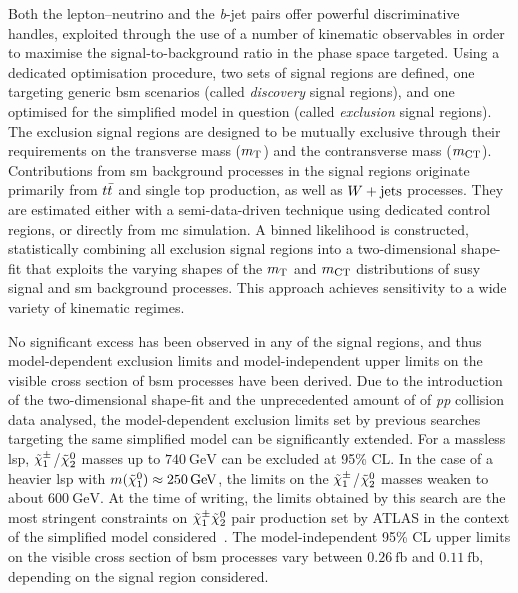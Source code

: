Both the lepton--neutrino and the \textit{b}-jet pairs offer powerful discriminative handles, exploited through the use of a number of kinematic observables in order to maximise the signal-to-background ratio in the phase space targeted.
Using a dedicated optimisation procedure, two sets of signal regions are defined, one targeting generic \gls{bsm} scenarios (called \textit{discovery} signal regions), and one optimised for the simplified model in question (called \textit{exclusion} signal regions). 
The exclusion signal regions are designed to be mutually exclusive through their requirements on the transverse mass ($m_{\textrm{T}}$) and the contransverse mass ($m_{\textrm{CT}}$).
Contributions from \gls{sm} background processes in the signal regions originate primarily from $t\bar{t}$ and single top production, as well as $W+\mathrm{jets}$ processes. They are estimated either with a semi-data-driven technique using dedicated control regions, or directly from \gls{mc} simulation.
A binned likelihood is constructed, statistically combining all exclusion signal regions into a two-dimensional shape-fit that exploits the varying shapes of the $m_{\textrm{T}}$ and $m_{\textrm{CT}}$ distributions of \gls{susy} signal and \gls{sm} background processes. This approach achieves sensitivity to a wide variety of kinematic regimes.

No significant excess has been observed in any of the signal regions, and thus model-dependent exclusion limits and model-independent upper limits on the visible cross section of \gls{bsm} processes have been derived.
Due to the introduction of the two-dimensional shape-fit and the unprecedented amount of \onethirtynineifb of \textit{pp} collision data analysed, the model-dependent exclusion limits set by previous searches targeting the same simplified model can be significantly extended.
For a massless \gls{lsp}, \mbox{$\tilde{\chi}_1^\pm$/$\tilde{\chi}_2^0$} masses up to $\SI{740}{\GeV}$ can be excluded at 95\% CL. In the case of a heavier \gls{lsp} with $m(\lsp)\approx\SI{250}{\GeV}$, the limits on the \mbox{$\tilde{\chi}_1^\pm$/$\tilde{\chi}_2^0$} masses weaken to about $\SI{600}{\GeV}$.
At the time of writing, the limits obtained by this search are the most stringent constraints on $\tilde{\chi}_1^\pm\tilde{\chi}_2^0$ pair production set by ATLAS in the context of the simplified model considered~\cite{ATL-PHYS-PUB-2020-020}.
The model-independent 95\% CL upper limits on the visible cross section of \gls{bsm} processes vary between $\SI{0.26}{\femto\barn}$ and $\SI{0.11}{\femto\barn}$, depending on the signal region considered. 

